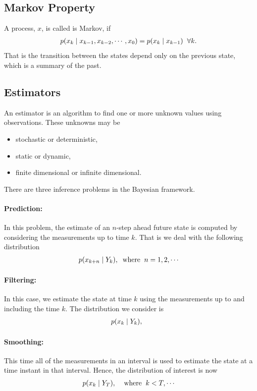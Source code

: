 \documentclass[twoside]{article}
\renewcommand{\k}{_k{}}
\begin{document}
\subsection*{Markov Property}
A process, $x$, is called is Markov, if
\begin{align*}
	p(x\k \mid x_{k-1},x_{k-2},\cdots,x_0) = p(x\k \mid x_{k-1})\hspace{0.2cm}\forall k.
\end{align*}
That is the transition between the states depend only on the previous state, which is a summary of the past.

\subsection*{Estimators}
An estimator is an algorithm to find one or more unknown values using observations. These unknowns may be 
\begin{itemize}
	\item stochastic or deterministic, 
	\item static or dynamic,
	\item finite dimensional or infinite dimensional.
\end{itemize}
There are three inference problems in the Bayesian framework. 

	\paragraph{\textbf{Prediction}:} In this problem, the estimate of an $n$-step ahead future state is computed by considering the measurements up to time $k$. That is we deal with the following distribution
	\begin{align*}
		p(x_{k+n}\mid Y_k),\hspace{0.2cm} \textrm{where} \hspace{0.2cm}n=1,2,\cdots
	\end{align*}
	\paragraph{\textbf{Filtering}:} In this case, we estimate the state at time $k$ using the measurements up to and including the time $k$. The distribution we consider is 
	\begin{align*}
		p(x_{k}\mid Y_k),\hspace{0.2cm} 
	\end{align*}
	\paragraph{\textbf{Smoothing}:}This time all of the measurements in an interval is used to estimate the state at a time instant in that interval. Hence, the distribution of interest is now
	\begin{align*}
		p(x_{k}\mid Y_T),\hspace{0.2cm}\hspace{0.2cm} \textrm{where} \hspace{0.2cm}k<T,\cdots
	\end{align*}
\end{document}
